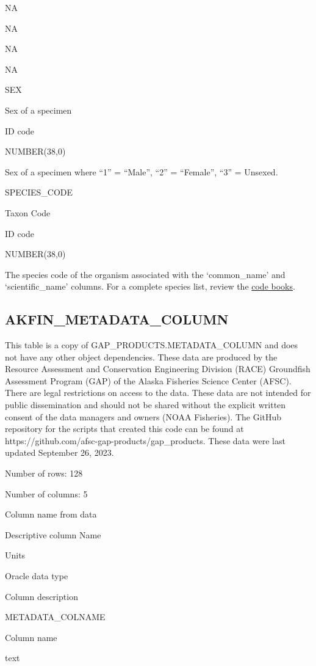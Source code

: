 \documentclass[
  letterpaper,
  oneside,
  open=any]{scrbook}
\begin{document}
NA

NA

NA

NA

SEX

Sex of a specimen

ID code

NUMBER(38,0)

Sex of a specimen where ``1'' = ``Male'', ``2'' = ``Female'', ``3'' =
Unsexed.

SPECIES\_CODE

Taxon Code

ID code

NUMBER(38,0)

The species code of the organism associated with the `common\_name' and
`scientific\_name' columns. For a complete species list, review the
\href{https://www.fisheries.noaa.gov/resource/document/groundfish-survey-species-code-manual-and-data-codes-manual}{code
books}.

\hypertarget{akfin_metadata_column}{%
\subsection{AKFIN\_METADATA\_COLUMN}\label{akfin_metadata_column}}

This table is a copy of GAP\_PRODUCTS.METADATA\_COLUMN and does not have
any other object dependencies. These data are produced by the Resource
Assessment and Conservation Engineering Division (RACE) Groundfish
Assessment Program (GAP) of the Alaska Fisheries Science Center (AFSC).
There are legal restrictions on access to the data. These data are not
intended for public dissemination and should not be shared without the
explicit written consent of the data managers and owners (NOAA
Fisheries). The GitHub repository for the scripts that created this code
can be found at https://github.com/afsc-gap-products/gap\_products.
These data were last updated September 26, 2023.

Number of rows: 128

Number of columns: 5

Column name from data

Descriptive column Name

Units

Oracle data type

Column description

METADATA\_COLNAME

Column name

text
\end{document}
